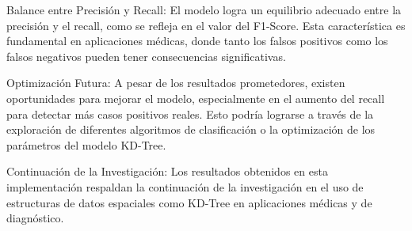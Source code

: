 \documentclass[]{article}
\begin{document}
Balance entre Precisión y Recall: El modelo logra un equilibrio adecuado entre la precisión y el recall, como se refleja en el valor del F1-Score. Esta característica es fundamental en aplicaciones médicas, donde tanto los falsos positivos como los falsos negativos pueden tener consecuencias significativas.

Optimización Futura: A pesar de los resultados prometedores, existen oportunidades para mejorar el modelo, especialmente en el aumento del recall para detectar más casos positivos reales. Esto podría lograrse a través de la exploración de diferentes algoritmos de clasificación o la optimización de los parámetros del modelo KD-Tree.

Continuación de la Investigación: Los resultados obtenidos en esta implementación respaldan la continuación de la investigación en el uso de estructuras de datos espaciales como KD-Tree en aplicaciones médicas y de diagnóstico.
\end{document}
